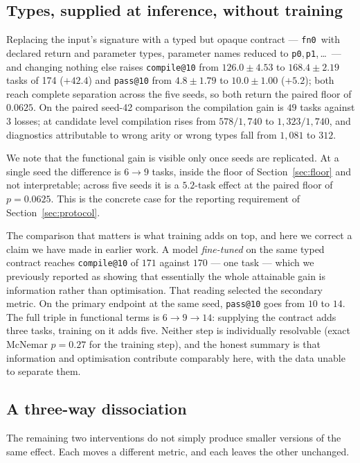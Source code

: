 \documentclass[conference]{IEEEtran}
\makeatletter
\newcommand{\passat}[1]{\texttt{pass@#1}\xspace}
\newcommand{\compileat}[1]{\texttt{compile@#1}\xspace}
\newcommand{\fnz}{\texttt{fn0}\xspace}
\makeatother
\begin{document}
\subsection{Types, supplied at inference, without training}
Replacing the input's signature with a typed but opaque contract --- \fnz\ with
declared return and parameter types, parameter names reduced to
\texttt{p0},\,\texttt{p1},\,\ldots\ --- and changing nothing else raises
\compileat{10} from $126.0\pm4.53$ to $168.4\pm2.19$ tasks of 174
($+42.4$) and \passat{10} from $4.8\pm1.79$ to $10.0\pm1.00$
($+5.2$); both reach complete separation across the five seeds, so both return
the paired floor of $0.0625$. On the paired seed-42 comparison the compilation gain
is $49$ tasks against $3$ losses; at candidate level compilation rises from
$578/1{,}740$ to $1{,}323/1{,}740$, and diagnostics attributable to wrong arity
or wrong types fall from $1{,}081$ to $312$.

We note that the functional gain is visible only once seeds are replicated. At a
single seed the difference is $6\rightarrow9$ tasks, inside the floor of
Section~\ref{sec:floor} and not interpretable; across five seeds it is a
$5.2$-task effect at the paired floor of $p{=}0.0625$. This is the concrete case for the
reporting requirement of Section~\ref{sec:protocol}.

The comparison that matters is what training adds on top, and here we correct a
claim we have made in earlier work. A model \emph{fine-tuned} on the same typed
contract reaches \compileat{10} of $171$ against $170$ --- one task --- which we
previously reported as showing that essentially the whole attainable gain is
information rather than optimisation. That reading selected the secondary metric.
On the primary endpoint at the same seed, \passat{10} goes from $10$ to $14$. The
full triple in functional terms is $6\rightarrow9\rightarrow14$: supplying the
contract adds three tasks, training on it adds five. Neither step is individually
resolvable (exact McNemar $p{=}0.27$ for the training step), and the honest
summary is that information and optimisation contribute comparably here, with the
data unable to separate them.

\subsection{A three-way dissociation}
The remaining two interventions do not simply produce smaller versions of the
same effect. Each moves a different metric, and each leaves the other unchanged.
\end{document}
